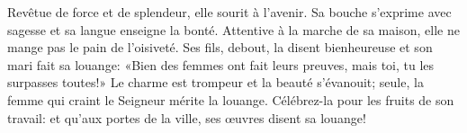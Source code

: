 Revêtue de force et de splendeur, elle sourit à l’avenir.
	Sa bouche s’exprime avec sagesse et sa langue enseigne la bonté.
Attentive à la marche de sa maison, elle ne mange pas le pain de l’oisiveté.
Ses fils, debout, la disent bienheureuse et son mari fait sa louange:
	«Bien des femmes ont fait leurs preuves, mais toi, tu les surpasses toutes!»
Le charme est trompeur et la beauté s’évanouit;
	seule, la femme qui craint le Seigneur mérite la louange.
Célébrez-la pour les fruits de son travail:
	et qu’aux portes de la ville, ses œuvres disent sa louange!
